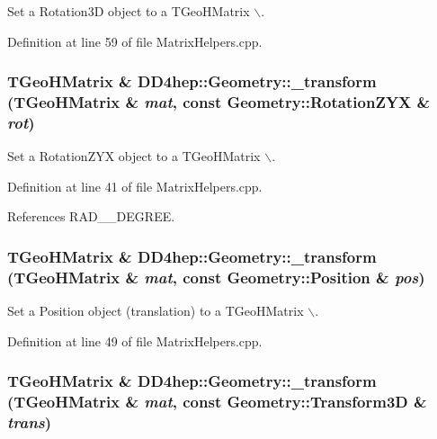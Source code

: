 Set a Rotation3D object to a TGeoHMatrix $\backslash$. 

Definition at line 59 of file MatrixHelpers.cpp.\hypertarget{group___d_d4_h_e_p___g_e_o_m_e_t_r_y_gae00745e30557512fe1da42fc705d42d1}{
\subsubsection[{\_\-transform}]{\setlength{\rightskip}{0pt plus 5cm}TGeoHMatrix \& DD4hep::Geometry::\_\-transform (TGeoHMatrix \& {\em mat}, \/  const Geometry::RotationZYX \& {\em rot})}}
\label{group___d_d4_h_e_p___g_e_o_m_e_t_r_y_gae00745e30557512fe1da42fc705d42d1}


Set a RotationZYX object to a TGeoHMatrix $\backslash$. 

Definition at line 41 of file MatrixHelpers.cpp.

References RAD\_\_\-DEGREE.\hypertarget{group___d_d4_h_e_p___g_e_o_m_e_t_r_y_ga115e4b33b3d4b31fc0c2a2de57c8a14b}{
\subsubsection[{\_\-transform}]{\setlength{\rightskip}{0pt plus 5cm}TGeoHMatrix \& DD4hep::Geometry::\_\-transform (TGeoHMatrix \& {\em mat}, \/  const Geometry::Position \& {\em pos})}}
\label{group___d_d4_h_e_p___g_e_o_m_e_t_r_y_ga115e4b33b3d4b31fc0c2a2de57c8a14b}


Set a Position object (translation) to a TGeoHMatrix $\backslash$. 

Definition at line 49 of file MatrixHelpers.cpp.\hypertarget{group___d_d4_h_e_p___g_e_o_m_e_t_r_y_gae56d3e609e5195af8ba7271391b608e5}{
\subsubsection[{\_\-transform}]{\setlength{\rightskip}{0pt plus 5cm}TGeoHMatrix \& DD4hep::Geometry::\_\-transform (TGeoHMatrix \& {\em mat}, \/  const Geometry::Transform3D \& {\em trans})}}
\label{group___d_d4_h_e_p___g_e_o_m_e_t_r_y_gae56d3e609e5195af8ba7271391b608e5}


